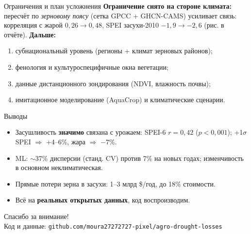 \documentclass[aspectratio=169,11pt]{beamer}
\begin{document}
\begin{frame}{Ограничения и план усложнения}
\textbf{Ограничение снято на стороне климата:} пересчёт по \emph{зерновому поясу} (сетка GPCC + GHCN-CAMS) усиливает связь: корреляция с жарой $0{,}26\to0{,}48$, SPEI засухи-2010 $-1{,}9\to-2{,}6$ (рис. в отчёте).
\medskip
\textbf{Дальше:}
\begin{enumerate}
  \item субнациональный уровень (регионы + климат зерновых районов);
  \item фенология и культуроспецифичные окна вегетации;
  \item данные дистанционного зондирования (NDVI, влажность почвы);
  \item имитационное моделирование (AquaCrop) и климатические сценарии.
\end{enumerate}
\end{frame}

\begin{frame}{Выводы}
\begin{itemize}
  \item Засушливость \textbf{значимо} связана с урожаем: SPEI-6 $r=0{,}42$ ($p<0{,}001$); +1$\sigma$ SPEI $\Rightarrow$ +4--6\%, жара $\Rightarrow$ $-7$\%.
  \item ML: $\sim$37\% дисперсии (станд. CV) против 7\% на новых годах; изменчивость в основном неклиматическая.
  \item Прямые потери зерна в засухи: 1--3 млрд \$/год, до 18\% стоимости.
  \item Всё на \textbf{реальных открытых данных}, код воспроизводим.
\end{itemize}
\end{frame}

\begin{frame}[plain]
\centering
\vfill
{\Large Спасибо за внимание!}\\[4mm]
{\footnotesize Код и данные: \texttt{github.com/moura27272727-pixel/agro-drought-losses}}
\vfill
\end{frame}
\end{document}
